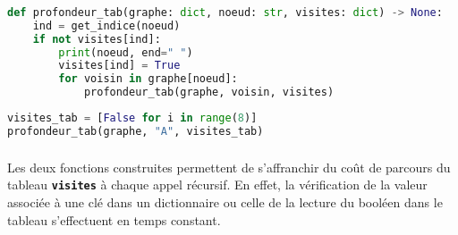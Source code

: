 \documentclass[svgnames,11pt]{beamer}
\begin{document}
\begin{frame}[fragile]
    \frametitle{}

\begin{center}
\begin{lstlisting}[language=Python , basicstyle=\ttfamily\small, xleftmargin=0.2em, xrightmargin=0em]
def profondeur_tab(graphe: dict, noeud: str, visites: dict) -> None:
    ind = get_indice(noeud)
    if not visites[ind]:
        print(noeud, end=" ")
        visites[ind] = True
        for voisin in graphe[noeud]:
            profondeur_tab(graphe, voisin, visites)
\end{lstlisting}

\begin{lstlisting}[language=Python , basicstyle=\ttfamily\small, xleftmargin=0.2em, xrightmargin=0em]
visites_tab = [False for i in range(8)]
profondeur_tab(graphe, "A", visites_tab)
\end{lstlisting}
\end{center} 

\end{frame}
\begin{frame}
    \frametitle{}

    \begin{aretenir}[Observation]
Les deux fonctions construites permettent de s'affranchir du coût de parcours du tableau \textbf{\texttt{visites}} à chaque appel récursif. En effet, la vérification de la valeur associée à une clé dans un dictionnaire ou celle de la lecture du booléen dans le tableau s'effectuent en temps constant.
    \end{aretenir}

\end{frame}
\end{document}
